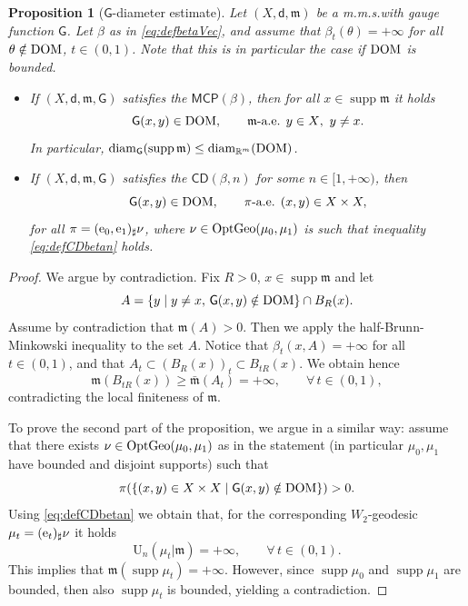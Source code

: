 \documentclass[11pt,a4paper]{article}
\theoremstyle{plain}
\newtheorem{proposition}[theorem]{Proposition}
\theoremstyle{definition}
\theoremstyle{remark}
\numberwithin{equation}{section}
\newcommand{\R}{\mathbb{R}} %
\newcommand{\DOM}{{\rm{DOM}}}
\DeclareMathOperator{\supp}{\mathrm{supp}}
\newcommand{\CD}{\mathsf{CD}}
\newcommand{\MCP}{\mathsf{MCP}}
\newcommand{\OptGeo}{{\rm OptGeo}}
\newcommand{\U}{\mathrm{U}}
\DeclareMathOperator{\diam}{\mathrm{diam}}
\newcommand{\mm}{\mathfrak m}
\newcommand{\ee}{{\rm e}}
\newcommand{\sfd}{\mathsf d}
\newcommand{\sfG}{\mathsf G}
\begin{document}
\begin{proposition}[$\sfG$-diameter estimate]\label{prop:GdiamestimateVec}
Let $(X,\sfd,\mm)$ be a m.m.s.\@ with gauge function $\sfG$. Let $\beta$ as in \eqref{eq:defbetaVec}, and assume that $\beta_t(\theta)=+\infty$ for all $\theta \notin \DOM$, $t\in (0,1)$. Note that this is in particular the case if $\DOM$ is bounded.
\begin{itemize}
\item If $(X,\sfd,\mm,\sfG)$ satisfies the $\MCP(\beta)$, then for all $x\in\supp\mm$ it holds
\begin{equation}
\sfG(x,y)\in \DOM, \qquad \mm\text{-a.e. $y \in X$,\, $y\neq x$}.
\end{equation}
In particular, $\diam_{\sfG}(\supp\mm) \leq \diam_{\R^m} (\DOM)$.

\item If $(X,\sfd,\mm,\sfG)$ satisfies the $\CD(\beta,n)$ for some $n\in [1,+\infty)$, then
\begin{equation}
\sfG(x,y) \in \DOM,\qquad \pi\text{-a.e. }(x,y)\in X\times X,
\end{equation}
for all $\pi = (\ee_0, \ee_1)_\sharp\nu$, where $\nu \in \OptGeo(\mu_0,\mu_1)$ is such that inequality  \eqref{eq:defCDbetan} holds.
\end{itemize}
\end{proposition}
\begin{proof}
We argue by contradiction. Fix $R>0$, $x\in\supp\mm$ and let 
\begin{equation}
A=\{y\mid  y\neq x, \, \sfG(x,y)\notin \DOM \}\cap B_R(x).
\end{equation}
Assume by contradiction that $\mm(A)>0$. Then we apply the half-Brunn-Minkowski inequality to the set $A$. Notice that $\beta_t(x,A) = +\infty$ for all $t\in (0,1)$, and that $A_t \subset (B_R(x))_t \subset B_{tR}(x)$. We obtain hence
\begin{equation}
\mm(B_{tR}(x)) \geq \bar{\mm}(A_t) = +\infty,\qquad \forall\, t\in(0,1),
\end{equation}
contradicting the local finiteness of $\mm$.

To prove the second part of the proposition, we argue in a similar way: assume that there exists $\nu\in \OptGeo(\mu_0,\mu_1)$ as in the statement (in particular $\mu_0,\mu_1$ have bounded and disjoint supports) such that 
\begin{equation}
\pi(\{(x,y)\in X\times X \mid \sfG(x,y) \notin \DOM \})>0.
\end{equation}
Using \eqref{eq:defCDbetan} we obtain that, for the corresponding $W_2$-geodesic $\mu_t = (\ee_t)_\sharp \nu$ it holds
\begin{equation}
\U_n(\mu_t|\mm) = +\infty,\qquad \forall\, t\in(0,1).
\end{equation}
This implies that $\mm(\supp\mu_t)=+\infty$. However, since $\supp\mu_0$ and $\supp\mu_1$ are bounded, then also $\supp\mu_t$ is bounded, yielding a contradiction.
\end{proof}
\end{document}

